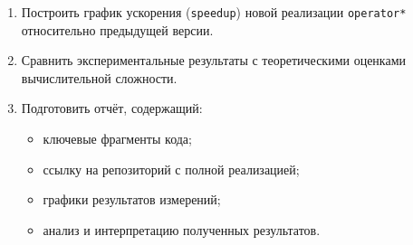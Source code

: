 \documentclass[12pt]{article}
\begin{document}
\begin{enumerate}
    \item Построить график ускорения (\texttt{speedup}) новой реализации \texttt{operator*} относительно предыдущей версии.

    \item Сравнить экспериментальные результаты с теоретическими оценками вычислительной сложности.

    \item Подготовить отчёт, содержащий:
    \begin{itemize}
        \item ключевые фрагменты кода;
        \item ссылку на репозиторий с полной реализацией;
        \item графики результатов измерений;
        \item анализ и интерпретацию полученных результатов.
    \end{itemize}
\end{enumerate}
\end{document}
